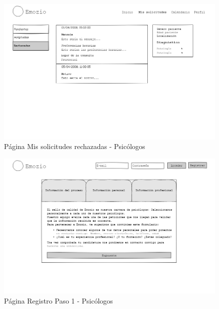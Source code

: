 \begin{figure}[htbp] 
    \centering
    \includegraphics[width=1\textwidth]{figuras/mockup_psicologos/mailrechazadas.png}
    \caption{Página Mis solicitudes rechazadas - Psicólogos}
\end{figure}	

\begin{figure}[htbp] 
    \centering
    \includegraphics[width=1\textwidth]{figuras/mockup_psicologos/registro1.png}
    \caption{Página Registro Paso 1 - Psicólogos}
\end{figure}	

